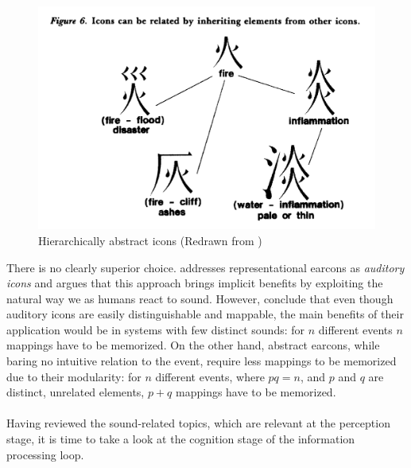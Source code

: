 \begin{figure}
	\centering
	\includegraphics[width=0.7\linewidth]{figures/placeholders/icons_tree_structure}
	\caption{Hierarchically abstract icons (Redrawn from \parencite{blatter_earcons_1989})}
	\label{fig:iconstreestructure}
\end{figure}

There is no clearly superior choice. \parencite{gaver_sonicfinder:_1989} addresses representational earcons as \textit{auditory icons} and argues that this approach brings implicit benefits by exploiting the natural way we as humans react to sound. 
However, \parencite{blattner_earcons_1989} conclude that even though auditory icons are easily distinguishable and mappable, the main benefits of their application would be in systems with few distinct sounds: for $n$ different events $n$ mappings have to be memorized.
On the other hand, abstract earcons, while baring no intuitive relation to the event, require less mappings to be memorized due to their modularity: for $n$ different events, where $pq=n$, and $p$ and $q$ are distinct, unrelated elements, $p+q$ mappings have to be memorized.

\paragraph[Bridge]{}
Having reviewed the sound-related topics, which are relevant at the perception stage, it is time to take a look at the cognition stage of the information processing loop.


